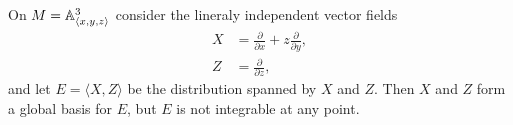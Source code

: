 \documentclass{lkx_paper}
\begin{document}
\begin{example}
	On $M= \mathbb{A}^3_{\langle x,y,z\rangle}$ consider the lineraly independent vector fields
	\[
		\begin{aligned}
			X & = \frac{\partial}{\partial x} + z\frac{\partial}{\partial y}, \\
			Z & = \frac{\partial}{\partial z},
		\end{aligned}
	\]
	and let $E=\langle X, Z \rangle$ be the distribution spanned by $X$ and $Z$. Then $X$ and $Z$ form a global basis for $E$, but $E$ is not integrable at any point.
\end{example}

\begin{example}
\end{example}

\end{document}
